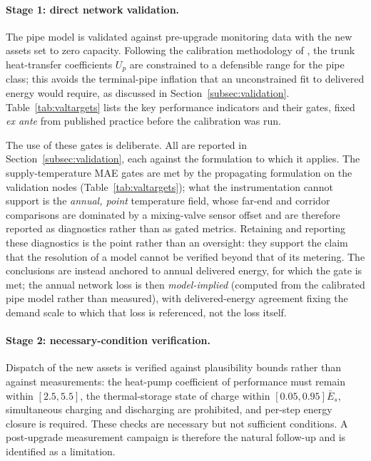 \documentclass[a4paper,fleqn]{cas-sc}
\providecommand{\citet}[1]{\cite{#1}}
\begin{document}
\paragraph{Stage 1: direct network validation.}
The pipe model is validated against pre-upgrade monitoring data with the new assets set to
zero capacity. Following the calibration methodology of \citet{Maldonado2024}, the trunk
heat-transfer coefficients $U_p$ are constrained to a defensible range for the pipe class;
this avoids the terminal-pipe inflation that an unconstrained fit to delivered energy would
require, as discussed in Section~\ref{subsec:validation}. Table~\ref{tab:valtargets} lists
the key performance indicators and their gates, fixed \emph{ex ante} from published practice
before the calibration was run.

The use of these gates is deliberate. All are reported in
Section~\ref{subsec:validation}, each against the formulation to which it applies. The
supply-temperature MAE gates are met by the propagating formulation on the validation nodes
(Table~\ref{tab:valtargets}); what the instrumentation cannot support is the \emph{annual,
point} temperature field, whose far-end and corridor comparisons are dominated by a
mixing-valve sensor offset and are therefore reported as diagnostics rather than as gated
metrics. Retaining and reporting these diagnostics is the point rather than an oversight:
they support the claim that the resolution of a model cannot be verified beyond that of its
metering. The conclusions are instead anchored to annual delivered energy, for which the gate
is met; the annual network loss is then \emph{model-implied} (computed from the calibrated
pipe model rather than measured), with delivered-energy agreement fixing the demand scale to
which that loss is referenced, not the loss itself.

\paragraph{Stage 2: necessary-condition verification.}
Dispatch of the new assets is verified against plausibility bounds rather than against
measurements: the heat-pump coefficient of performance must remain within \([2.5,5.5]\),
the thermal-storage state of charge within \([0.05,0.95]\bar{E}_s\), simultaneous charging
and discharging are prohibited, and per-step energy closure is required. These checks are
necessary but not sufficient conditions. A post-upgrade measurement campaign is therefore
the natural follow-up and is identified as a limitation.
\end{document}

